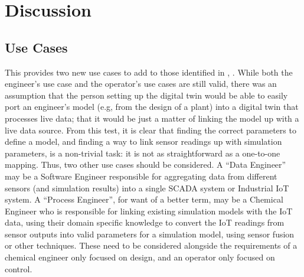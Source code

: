 


\section{Discussion}

\subsection{Use Cases}
This provides two new use cases to add to those identified in , . 
While both the engineer's use case and the operator's use cases are still valid, there was an assumption that the person setting up the digital twin would be able to easily port an engineer's model (e.g, from the design of a plant) into a digital twin that processes live data; that it would be just a matter of linking the model up with a live data source. 
From this test, it is clear that finding the correct parameters to define a model, and finding a way to link sensor readings up with simulation parameters, is a non-trivial task: it is not as straightforward as a one-to-one mapping. 
Thus, two other use cases should be considered. A ``Data Engineer'' may be a Software Engineer responsible for aggregating data from different sensors (and simulation results) into a single SCADA system or Industrial IoT system. 
A ``Process Engineer'', for want of a better term, may be a Chemical Engineer who is responsible for linking existing simulation models with the IoT data, using their domain specific knowledge to convert the IoT readings from sensor outputs into valid parameters for a simulation model, using sensor fusion or other techniques. 
These need to be considered alongside the requirements of a chemical engineer only focused on design, and an operator only focused on control.


